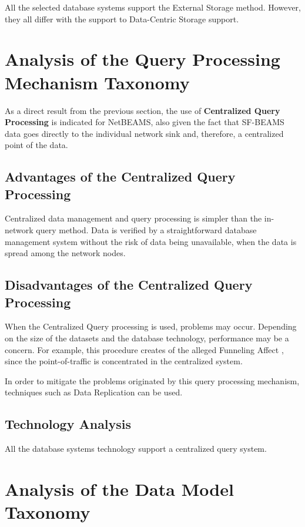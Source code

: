 All the selected database systems support the External Storage method. However,
they all differ with the support to Data-Centric Storage support.

\section{Analysis of the Query Processing Mechanism Taxonomy}

As a direct result from the previous section, the use of \textbf{Centralized Query
Processing} is indicated for NetBEAMS, also given the fact that SF-BEAMS data
goes directly to the individual network sink and, therefore, a centralized
point of the data.

\subsection{Advantages of the Centralized Query Processing}

Centralized data management and query processing is simpler than the in-network
query method. Data is verified by a straightforward database management system
without the risk of data being unavailable, when the data is spread among the
network nodes.

\subsection{Disadvantages of the Centralized Query Processing}

When the Centralized Query processing is used, problems may occur. Depending on
the size of the datasets and the database technology, performance may be a
concern. For example, this procedure creates of the alleged Funneling Affect
\cite{sn-storage04}, since the point-of-traffic is concentrated in the
centralized system.

In order to mitigate the problems originated by this query processing
mechanism, techniques such as Data Replication can be used.

\subsection{Technology Analysis}

All the database systems technology support a centralized query system.

\section{Analysis of the Data Model Taxonomy}

